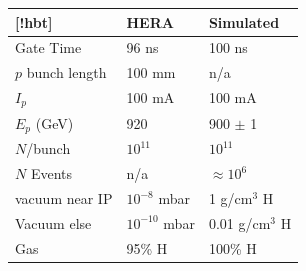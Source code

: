 \begin{center}
	\begin{tabular}{ l l l }[!hbt]
		& HERA & Simulated \\ 
		\hline \hline
		Gate Time & 96 ns & 100 ns \\ 
		$p$ bunch length & 100 mm & n/a \\ 
		$I_p$ & 100 mA & 100 mA\\
		$E_p$ (GeV)& 920 & 900 $\pm$ 1 \\
		$N$/bunch & $10^{11}$ & $10^{11}$\\
		$N$ Events & n/a & $\approx 10^6$\\
		vacuum near IP& $10^{-8}$ mbar  & 1 g/cm$^3$ H \\
		Vacuum else& $10^{-10}$ mbar & 0.01 g/cm$^3$ H\\
		Gas & 95\% H & 100\% H\\
		\hline
	\end{tabular}
\end{center}


